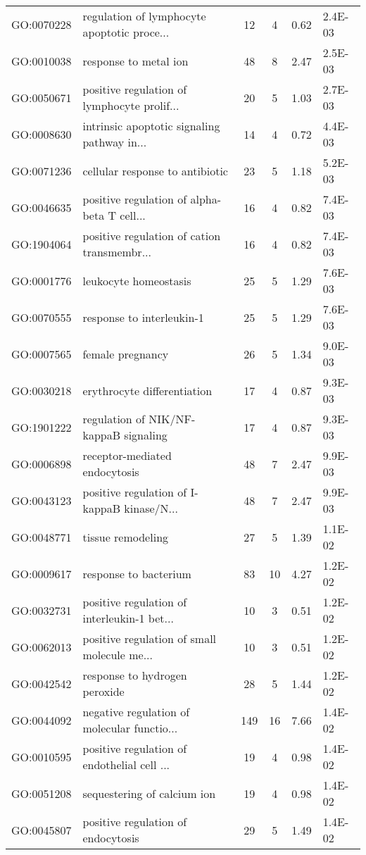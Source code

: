 \begin{table}[ht]
\begin{tabular}{llcccl}
  GO:0070228 & regulation of lymphocyte apoptotic proce... &  12 &   4 & 0.62 & 2.4E-03 \\ 
  GO:0010038 & response to metal ion &  48 &   8 & 2.47 & 2.5E-03 \\ 
  GO:0050671 & positive regulation of lymphocyte prolif... &  20 &   5 & 1.03 & 2.7E-03 \\ 
  GO:0008630 & intrinsic apoptotic signaling pathway in... &  14 &   4 & 0.72 & 4.4E-03 \\ 
  GO:0071236 & cellular response to antibiotic &  23 &   5 & 1.18 & 5.2E-03 \\ 
  GO:0046635 & positive regulation of alpha-beta T cell... &  16 &   4 & 0.82 & 7.4E-03 \\ 
  GO:1904064 & positive regulation of cation transmembr... &  16 &   4 & 0.82 & 7.4E-03 \\ 
  GO:0001776 & leukocyte homeostasis &  25 &   5 & 1.29 & 7.6E-03 \\ 
  GO:0070555 & response to interleukin-1 &  25 &   5 & 1.29 & 7.6E-03 \\ 
  GO:0007565 & female pregnancy &  26 &   5 & 1.34 & 9.0E-03 \\ 
  GO:0030218 & erythrocyte differentiation &  17 &   4 & 0.87 & 9.3E-03 \\ 
  GO:1901222 & regulation of NIK/NF-kappaB signaling &  17 &   4 & 0.87 & 9.3E-03 \\ 
  GO:0006898 & receptor-mediated endocytosis &  48 &   7 & 2.47 & 9.9E-03 \\ 
  GO:0043123 & positive regulation of I-kappaB kinase/N... &  48 &   7 & 2.47 & 9.9E-03 \\ 
  GO:0048771 & tissue remodeling &  27 &   5 & 1.39 & 1.1E-02 \\ 
  GO:0009617 & response to bacterium &  83 &  10 & 4.27 & 1.2E-02 \\ 
  GO:0032731 & positive regulation of interleukin-1 bet... &  10 &   3 & 0.51 & 1.2E-02 \\ 
  GO:0062013 & positive regulation of small molecule me... &  10 &   3 & 0.51 & 1.2E-02 \\ 
  GO:0042542 & response to hydrogen peroxide &  28 &   5 & 1.44 & 1.2E-02 \\ 
  GO:0044092 & negative regulation of molecular functio... & 149 &  16 & 7.66 & 1.4E-02 \\ 
  GO:0010595 & positive regulation of endothelial cell ... &  19 &   4 & 0.98 & 1.4E-02 \\ 
  GO:0051208 & sequestering of calcium ion &  19 &   4 & 0.98 & 1.4E-02 \\ 
  GO:0045807 & positive regulation of endocytosis &  29 &   5 & 1.49 & 1.4E-02 \\ 
   \hline
\end{tabular}
\end{table}
  
